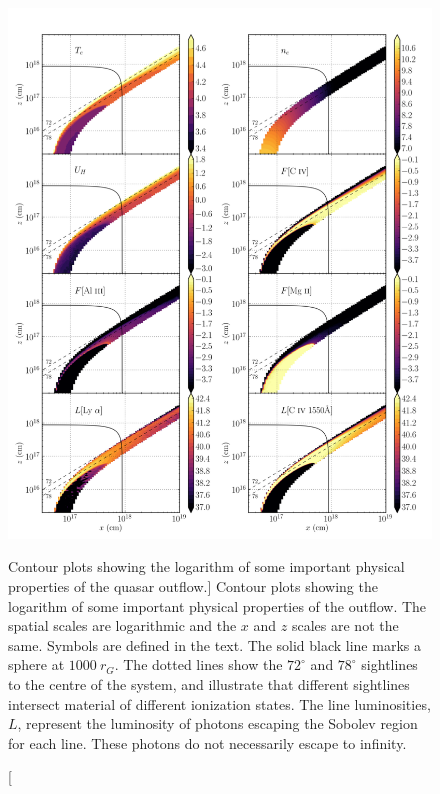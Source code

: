 \begin{figure}
\centering
\includegraphics[width=1.0\textwidth]{figures/06-agnpaper/fig2.png}
\caption
[Contour plots showing the logarithm of some important 
physical properties of the quasar outflow.]
{
Contour plots showing the logarithm of some important 
physical properties of the outflow. The spatial scales are
logarithmic and the $x$ and $z$ scales are not the same.
Symbols are defined in the text.
The solid black line marks a sphere at $1000~r_G$.
The dotted lines show the $72^\circ$ and $78^\circ$ sightlines 
to the centre of the system, and illustrate that different sightlines
intersect material of different ionization states.
The line luminosities, $L$, represent the luminosity of photons
escaping the Sobolev region for each line. These photons do not
necessarily escape to infinity.
}
\label{fig:wind}
\end{figure}

